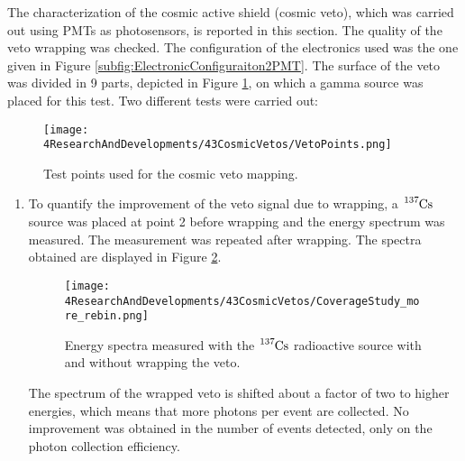 The characterization of the cosmic active shield (cosmic veto), which was carried out using PMTs as photosensors, is reported in this section. The quality of the veto wrapping was checked. The configuration of the electronics used was the one given in Figure \ref{subfig:ElectronicConfiguraiton2PMT}. The surface of the veto was divided in 9 parts, depicted in Figure \ref{fig:MappingPoints}, on which a gamma source was placed for this test. Two different tests were carried out:

\begin{figure}[h]
\centering
\texttt{[image: 4ResearchAndDevelopments/43CosmicVetos/VetoPoints.png]}
\caption{Test points used for the cosmic veto mapping.\label{fig:MappingPoints}}
\end{figure}
\begin{enumerate}

\item{} To quantify the improvement of the veto signal due to wrapping, a $\ce{^{137}Cs}$ source was placed at point 2 before wrapping and the energy spectrum was measured. The measurement was repeated after wrapping. The spectra obtained are displayed in Figure \ref{fig:VetoCoverageImprovement}.

\begin{figure}[h]
\centering
\texttt{[image: 4ResearchAndDevelopments/43CosmicVetos/CoverageStudy\_more\_rebin.png]}
\caption{Energy spectra measured with the $\ce{^{137}Cs}$ radioactive source with and without wrapping the veto.\label{fig:VetoCoverageImprovement}}
\end{figure}

The spectrum of the wrapped veto is shifted about a factor of two to higher energies, which means that more photons per event are collected. No improvement was obtained in the number of events detected, only on the photon collection efficiency.



\end{enumerate}
